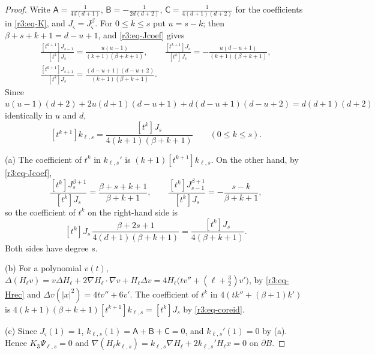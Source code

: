 \documentclass[11pt]{amsart}
\theoremstyle{definition}
\theoremstyle{remark}
\numberwithin{equation}{section}
\begin{document}
\begin{proof}
Write $\mathsf A=\frac1{4d(d+1)}$, $\mathsf B=-\frac1{2d(d+2)}$, $\mathsf C=\frac1{4(d+1)(d+2)}$ for the coefficients in \eqref{r3:eq-K}, and $J_\varsigma=J^\beta_\varsigma$. For $0\leq k\leq s$ put $u=s-k$; then $\beta+s+k+1=d-u+1$, and \eqref{r3:eq-Jcoef} gives
\begin{gather*}
\frac{[t^{k+1}]J_{s-1}}{[t^k]J_s}=\frac{u(u-1)}{(k+1)(\beta+k+1)},\qquad\frac{[t^{k+1}]J_s}{[t^k]J_s}=-\frac{u(d-u+1)}{(k+1)(\beta+k+1)},\\
\frac{[t^{k+1}]J_{s+1}}{[t^k]J_s}=\frac{(d-u+1)(d-u+2)}{(k+1)(\beta+k+1)} .
\end{gather*}
Since $u(u-1)(d+2)+2u(d+1)(d-u+1)+d(d-u+1)(d-u+2)=d(d+1)(d+2)$ identically in $u$ and $d$,
\begin{equation}\label{r3:eq-coreid}
[t^{k+1}]k_{\ell,s}=\frac{[t^k]J_s}{4(k+1)(\beta+k+1)}\qquad(0\leq k\leq s).
\end{equation}

(a) The coefficient of $t^k$ in $k_{\ell,s}'$ is $(k+1)[t^{k+1}]k_{\ell,s}$. On the other hand, by \eqref{r3:eq-Jcoef},
\[
\frac{[t^k]J^{\beta+1}_s}{[t^k]J_s}=\frac{\beta+s+k+1}{\beta+k+1},\qquad\frac{[t^k]J^{\beta+1}_{s-1}}{[t^k]J_s}=-\frac{s-k}{\beta+k+1},
\]
so the coefficient of $t^k$ on the right-hand side is
\[
[t^k]J_s\,\frac{\beta+2s+1}{4(d+1)(\beta+k+1)}=\frac{[t^k]J_s}{4(\beta+k+1)} .
\]
Both sides have degree $s$.

(b) For a polynomial $v(t)$, $\Delta(H_\ell v)=v\Delta H_\ell+2\nabla H_\ell\cdot\nabla v+H_\ell\Delta v=4H_\ell\big(tv''+(\ell+\frac32)v'\big)$, by \eqref{r3:eq-Hrec} and $\Delta v(|x|^2)=4tv''+6v'$. The coefficient of $t^k$ in $4(tk''+(\beta+1)k')$ is $4(k+1)(\beta+k+1)[t^{k+1}]k_{\ell,s}=[t^k]J_s$ by \eqref{r3:eq-coreid}.

(c) Since $J_\varsigma(1)=1$, $k_{\ell,s}(1)=\mathsf A+\mathsf B+\mathsf C=0$, and $k_{\ell,s}'(1)=0$ by (a). Hence $K_3\Psi_{\ell,s}=0$ and $\nabla(H_\ell k_{\ell,s})=k_{\ell,s}\nabla H_\ell+2k_{\ell,s}'H_\ell x=0$ on $\partial B$.


\end{proof}
\end{document}
